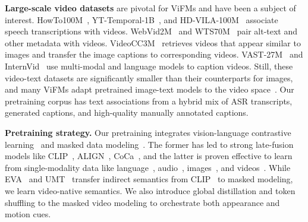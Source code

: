 \documentclass{article}
\theoremstyle{plain}
\theoremstyle{definition}
\theoremstyle{remark}
\begin{document}
\textbf{Large-scale video datasets} are pivotal for ViFMs and have been a subject of interest. HowTo100M~\cite{miech2019howto100m}, YT-Temporal-1B~\cite{zellers2022merlot}, and HD-VILA-100M~\cite{xue2022advancing} associate speech transcriptions with videos. WebVid2M~\cite{bain2021frozen} and WTS70M~\cite{stroud2020learning} pair alt-text and other metadata with videos.  VideoCC3M~\cite{nagrani2022learning} retrieves videos that appear similar to images and transfer the image captions to corresponding videos.  VAST-27M~\cite{chen2023vast} and InternVid~\cite{ wang2023internvid} use  multi-modal and language models to caption videos. Still, these video-text datasets are significantly smaller than their counterparts for images, and many ViFMs adapt pretrained image-text models to the video space~\cite{fang2021clip2video,luo2022clip4clip,xue2022clipvip,liu2023revisiting,he2023vlab,wu2023building}. Our pretraining corpus has text associations from a hybrid mix of ASR transcripts, generated captions, and high-quality manually annotated captions.

\textbf{Pretraining strategy.} Our pretraining integrates vision-language contrastive learning~\cite{radford2021learning,xu2021videoclip,bain2022clip} and masked data modeling~\cite{devlin2019bert,he2022masked}. The former has led to strong late-fusion models like CLIP~\cite{radford2021learning}, ALIGN~\cite{jia2021scaling}, CoCa~\cite{yu2022coca}, and the latter is proven effective to learn from single-modality data like language~\cite{devlin2019bert,anil2023palm}, audio~\cite{borsos2023audiolm}, images~\cite{he2022masked,wang2023image,oquab2023dinov2}, and videos~\cite{tong2022videomae,wang2023videomae}. While EVA~\cite{fang2022eva,fang2023eva} and UMT~\cite{li2023unmasked} transfer indirect semantics from CLIP~\cite{radford2021learning} to masked modeling, we learn video-native semantics. We also introduce global distillation and token shuffling to the masked video modeling to orchestrate both appearance and motion cues.
\end{document}

